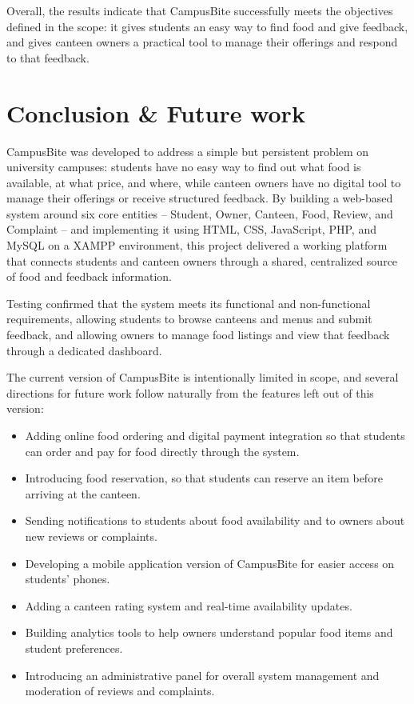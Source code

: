 \documentclass[ 12pt,a4paper,twocolumn,fleqn]{article}
\begin{document}
Overall, the results indicate that CampusBite successfully meets the objectives defined in the scope: it gives students an easy way to find food and give feedback, and gives canteen owners a practical tool to manage their offerings and respond to that feedback.

\clearpage

\newpage

\section{Conclusion \& Future work}

CampusBite was developed to address a simple but persistent problem on university campuses: students have no easy way to find out what food is available, at what price, and where, while canteen owners have no digital tool to manage their offerings or receive structured feedback. By building a web-based system around six core entities -- Student, Owner, Canteen, Food, Review, and Complaint -- and implementing it using HTML, CSS, JavaScript, PHP, and MySQL on a XAMPP environment, this project delivered a working platform that connects students and canteen owners through a shared, centralized source of food and feedback information.

Testing confirmed that the system meets its functional and non-functional requirements, allowing students to browse canteens and menus and submit feedback, and allowing owners to manage food listings and view that feedback through a dedicated dashboard.

The current version of CampusBite is intentionally limited in scope, and several directions for future work follow naturally from the features left out of this version:
\begin{itemize}
    \item Adding online food ordering and digital payment integration so that students can order and pay for food directly through the system.
    \item Introducing food reservation, so that students can reserve an item before arriving at the canteen.
    \item Sending notifications to students about food availability and to owners about new reviews or complaints.
    \item Developing a mobile application version of CampusBite for easier access on students' phones.
    \item Adding a canteen rating system and real-time availability updates.
    \item Building analytics tools to help owners understand popular food items and student preferences.
    \item Introducing an administrative panel for overall system management and moderation of reviews and complaints.
\end{itemize}
\end{document}
